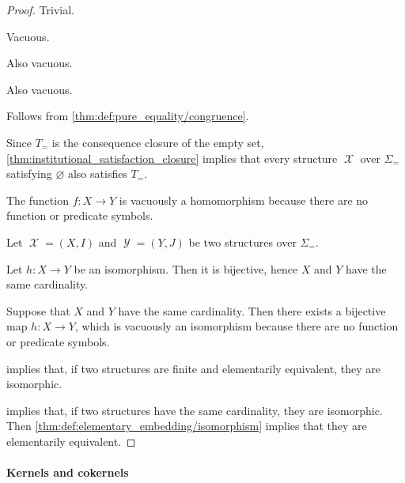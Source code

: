 \begin{proof}
   Trivial.

   Vacuous.

   Also vacuous.

   Also vacuous.

   Follows from \cref{thm:def:pure_equality/congruence}.

   Since \( T_= \) is the consequence closure of the empty set, \cref{thm:institutional_satisfaction_closure} implies that every structure \( \mscrX \) over \( \Sigma_= \) satisfying \( \varnothing \) also satisfies \( T_= \).

   The function \( f: X \to Y \) is vacuously a homomorphism because there are no function or predicate symbols.

   Let \( \mscrX = (X, I) \) and \( \mscrY = (Y, J) \) be two structures over \( \Sigma_= \).

  \SufficiencySubProof* Let \( h: X \to Y \) be an isomorphism. Then it is bijective, hence \( X \) and \( Y \) have the same cardinality.

  \NecessitySubProof* Suppose that \( X \) and \( Y \) have the same cardinality. Then there exists a bijective map \( h: X \to Y \), which is vacuously an isomorphism because there are no function or predicate symbols.


  \SufficiencySubProof* {} implies that, if two structures are finite and elementarily equivalent, they are isomorphic.

  \NecessitySubProof* {} implies that, if two structures have the same cardinality, they are isomorphic. Then \cref{thm:def:elementary_embedding/isomorphism} implies that they are elementarily equivalent.
\end{proof}

\paragraph{Kernels and cokernels}

